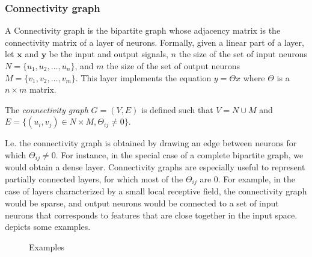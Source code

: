 
\subsubsection{Connectivity graph}
\label{con_graph}

A Connectivity graph is the bipartite graph whose adjacency matrix is the connectivity matrix of a layer of neurons.
Formally, given a linear part of a layer, let $\textbf{x}$ and $\textbf{y}$ be the input and output signals, $n$ the size of the set of input neurons $N = \{u_1, u_2, \ldots, u_n\}$, and $m$ the size of the set of output neurons $M = \{v_1, v_2, \ldots, v_m\}$. This layer implements the equation $y = \Theta x$ where $\Theta$ is a $n \times m$ matrix.

\begin{definition}
{The \emph{connectivity graph} $G = (V,E)$ is defined such that $V = N \cup M$ and $E = \{(u_i,v_j) \in  N \times M, \Theta_{ij} \neq 0 \} $.}
\end{definition}

I.e. the connectivity graph is obtained by drawing an edge between neurons for which $\Theta_{ij} \neq 0$.
For instance, in the special case of a complete bipartite graph, we would obtain a dense layer. 
Connectivity graphs are especially useful to represent partially connected layers, for which most of the $\Theta_{ij}$ are $0$. 
For example, in the case of layers characterized by a small local receptive field, the connectivity graph would be sparse, and output neurons would be connected to a set of input neurons that corresponds to features that are close together in the input space.  depicts some examples.

\begin{figure}[h]
  \begin{center}
  \end{center}
  \caption{Examples}
  \label{con_ex}
\end{figure}

